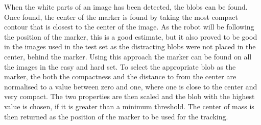 When the white parts of an image has been detected, the blobs can be found.
Once found, the center of the marker is found by taking the most compact contour that is closest to the center of the image.
As the robot will be following the position of the marker, this is a good estimate, but it also proved to be good in the images used in the test set as the distracting blobs were not placed in the center, behind the marker.
Using this approach the marker can be found on all the images in the easy and hard set.
To select the appropriate blob as the marker, the both the compactness and the distance to from the center are normalised to a value between zero and one, where one is close to the center and very compact.
The two properties are then scaled and the blob with the highest value is chosen, if it is greater than a minimum threshold.
The center of mass is then returned as the position of the marker to be used for the tracking.
